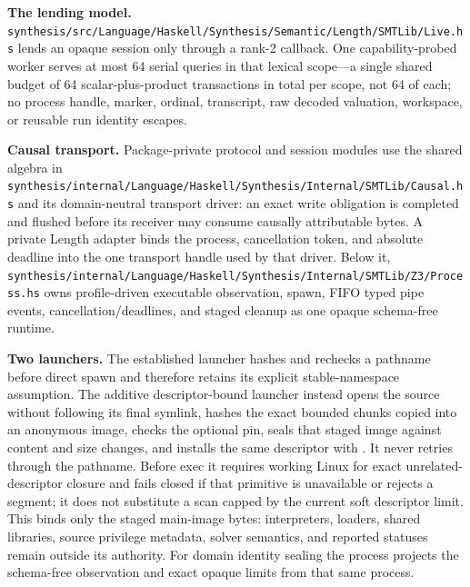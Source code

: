 \documentclass[10pt,letterpaper,oneside]{report}
\newcommand{\code}[1]{\texttt{\detokenize{#1}}}
\newcommand{\filepath}[1]{\nolinkurl{#1}}
\begin{document}
\begin{enumerate}
  \textbf{The lending model.} \filepath{synthesis/src/Language/Haskell/Synthesis/Semantic/Length/SMTLib/Live.hs} lends an opaque session only through a rank-2 callback. One capability-probed worker serves at most 64 serial queries in that lexical scope---a single shared budget of 64 scalar-plus-product transactions in total per scope, not 64 of each; no process handle, marker, ordinal, transcript, raw decoded valuation, workspace, or reusable run identity escapes.

  \textbf{Causal transport.} Package-private protocol and session modules use the shared \code{SMTLibCausalAction} algebra in \filepath{synthesis/internal/Language/Haskell/Synthesis/Internal/SMTLib/Causal.hs} and its domain-neutral transport driver: an exact write obligation is completed and flushed before its receiver may consume causally attributable bytes. A private Length adapter binds the process, cancellation token, and absolute deadline into the one transport handle used by that driver. Below it, \filepath{synthesis/internal/Language/Haskell/Synthesis/Internal/SMTLib/Z3/Process.hs} owns profile-driven executable observation, spawn, FIFO typed pipe events, cancellation/deadlines, and staged cleanup as one opaque schema-free runtime.

  \textbf{Two launchers.} The established launcher hashes and rechecks a pathname before direct spawn and therefore retains its explicit stable-namespace assumption. The additive descriptor-bound launcher instead opens the source without following its final symlink, hashes the exact bounded chunks copied into an anonymous image, checks the optional pin, seals that staged image against content and size changes, and installs the same descriptor with \code{execveat}. It never retries through the pathname. Before exec it requires working Linux \code{close\_range} for exact unrelated-descriptor closure and fails closed if that primitive is unavailable or rejects a segment; it does not substitute a scan capped by the current soft descriptor limit. This binds only the staged main-image bytes: interpreters, loaders, shared libraries, source privilege metadata, solver semantics, and reported statuses remain outside its authority. For domain identity sealing the process projects the schema-free observation and exact opaque limits from that same process.


\end{enumerate}
\end{document}
